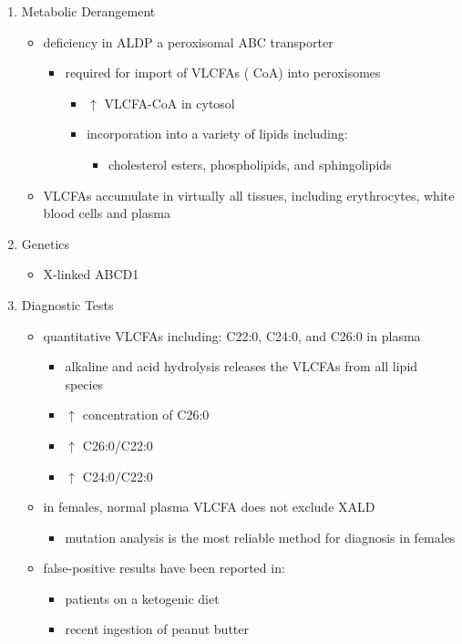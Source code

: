 \documentclass{scrartcl}
\begin{document}
\begin{enumerate}
\item Metabolic Derangement
\label{sec:org6aab544}
\begin{itemize}
\item deficiency in ALDP a peroxisomal ABC transporter
\begin{itemize}
\item required for import of VLCFAs (\textpm{} CoA) into peroxisomes
\begin{itemize}
\item \(\uparrow\) VLCFA-CoA in cytosol
\item incorporation into a variety of lipids including:
\begin{itemize}
\item cholesterol esters, phospholipids, and sphingolipids
\end{itemize}
\end{itemize}
\end{itemize}
\item VLCFAs accumulate in virtually all tissues, including erythrocytes,
white blood cells and plasma
\end{itemize}

\item Genetics
\label{sec:orgda9877f}
\begin{itemize}
\item X-linked ABCD1
\end{itemize}

\item Diagnostic Tests
\label{sec:org1b1bba7}
\begin{itemize}
\item quantitative VLCFAs including: C22:0, C24:0, and C26:0 in plasma
\begin{itemize}
\item alkaline and acid hydrolysis releases the VLCFAs from all lipid
species
\item \(\uparrow\) concentration of C26:0
\item \(\uparrow\) C26:0/C22:0
\item \(\uparrow\) C24:0/C22:0
\end{itemize}

\item in females, normal plasma VLCFA does not exclude XALD
\begin{itemize}
\item mutation analysis is the most reliable method for diagnosis in females
\end{itemize}

\item false-positive results have been reported in:
\begin{itemize}
\item patients on a ketogenic diet
\item recent ingestion of peanut butter
\end{itemize}
\end{itemize}


\end{enumerate}
\end{document}
